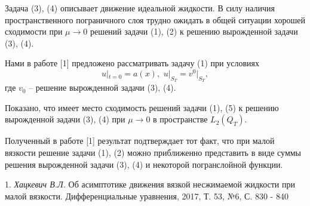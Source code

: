 Задача (3), (4) описывает движение идеальной жидкости.
В силу наличия пространственного пограничного слоя трудно ожидать в общей ситуации хорошей сходимости при $\mu\rightarrow 0$  решений задачи (1), (2) к решению вырожденной задачи (3), (4).

Нами в работе [1] предложено рассматривать задачу (1) при условиях
\begin{equation}
u|_{t=0} = a(x),\,\,u|_{S_T}= v^0|_{S_T},
\end{equation}
где $v_0$ -- решение вырожденной задачи (3), (4).

Показано, что имеет место сходимость решений задачи (1), (5) к решению вырожденной задачи (3), (4) при $\mu\rightarrow 0$ в пространстве $L_2(Q_T)$.

Полученный в работе [1] результат подтверждает тот факт, что при малой вязкости решение задачи (1), (2) можно приближенно представить в виде суммы решения вырожденной задачи (3), (4) и некоторой погранслойной функции.

\litlist

1. {\it Хацкевич В.Л.} Об асимптотике движения вязкой несжимаемой жидкости 	при малой вязкости. Дифференциальные уравнения, 2017, Т. 53, №6, С. 830 - 840

